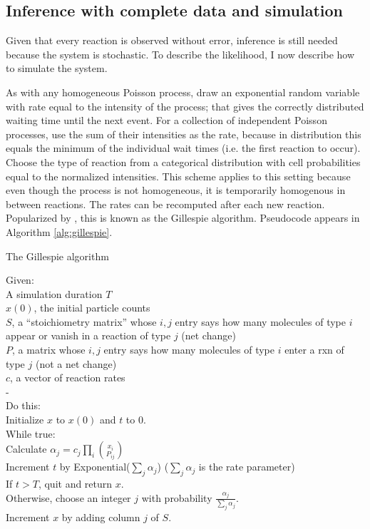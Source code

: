 \documentclass{article}
\begin{document}
\subsection{Inference with complete data and simulation}
Given that every reaction is observed without error, inference is still needed because the system is stochastic. To describe the likelihood, I now describe how to simulate the system.

As with any homogeneous Poisson process, draw an exponential random variable with rate equal to the intensity of the process; that gives the correctly distributed waiting time until the next event. For a collection of independent Poisson processes, use the sum of their intensities as the rate, because in distribution this equals the minimum of the individual wait times (i.e. the first reaction to occur). Choose the type of reaction from a categorical distribution with cell probabilities equal to the normalized intensities. This scheme applies to this setting because even though the process is not homogeneous, it is temporarily homogenous in between reactions. The rates can be recomputed after each new reaction. Popularized by  \cite{gillespie1977}, this is known as the Gillespie algorithm. Pseudocode appears in Algorithm \ref{alg:gillespie}.


\begin{algorithm}[h]
\caption{The Gillespie algorithm \label{alg:gillespie}}
Given:\\
\Indp
A simulation duration $T$\\
$x(0)$, the initial particle counts\\
$S$, a ``stoichiometry matrix'' whose $i,j$ entry says how many molecules of type $i$ appear or vanish in a reaction of type $j$ (net change)\\
$P$, a matrix whose $i,j$ entry says how many molecules of type $i$ enter a rxn of type $j$ (not a net change)\\
$c$, a vector of reaction rates\\
-\\
\Indm
Do this:\\
\Indp
Initialize $x$ to $x(0)$ and $t$ to 0.\\
While true:\\
\Indp
Calculate $\alpha_j = c_j\prod_i {x_i\choose P_{ij}}$\\
Increment $t$ by Exponential($\sum_j \alpha_j$) ($\sum_j \alpha_j$ is the rate parameter)\\
If $t > T$, quit and return $x$.\\
Otherwise, choose an integer $j$ with probability $\frac{\alpha_j}{\sum_j \alpha_j}$.\\
Increment $x$ by adding column $j$ of $S$.\\
\end{algorithm}
\end{document}
